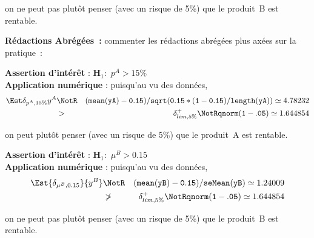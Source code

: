 \documentclass[10pt]{report}
\begin{document}
\begin{exercice}
on ne peut pas plutôt penser (avec un risque de 5\%) que le produit~B est rentable.

\noindent \textbf{Rédactions Abrégées~:} commenter les rédactions abrégées plus axées sur la pratique~:

\noindent {}\hrulefill

\noindent \textbf{Assertion d'intérêt} :  $\mathbf{H}_1:$ $p^{A}>15\%$ \\
\textbf{Application numérique} :  puisqu'au vu des données, 
  \begin{eqnarray*}
\Est{\delta_{p^{A},15\%}}{y^{A}} &\NotR&\mathtt{(mean(yA)-0.15)/sqrt(0.15*(1-0.15)/length(yA))}\simeq 4.78232\\& >  & \delta^+_{lim,5\%} \NotR \mathtt{qnorm(1-.05)}\simeq1.644854
\end{eqnarray*}
  
on peut plutôt penser (avec un risque de 5\%) que le produit~A est rentable.

\noindent {}\hrulefill

\noindent \textbf{Assertion d'intérêt} :  $\mathbf{H}_1:$ $\mu^{B}>0.15$ \\
\textbf{Application numérique} :  puisqu'au vu des données, 
  \begin{eqnarray*}
\Est{\delta_{\mu^{B},0.15}}{y^{B}} &\NotR&\mathtt{(mean(yB)-0.15)/seMean(yB)}\simeq 1.24009\\&\ngtr & \delta^+_{lim,5\%} \NotR \mathtt{qnorm(1-.05)}\simeq1.644854
\end{eqnarray*}
  
on ne peut pas plutôt penser (avec un risque de 5\%) que le produit~B est rentable.
\end{exercice}
\end{document}
